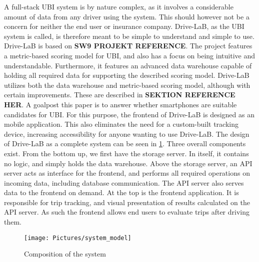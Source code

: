A full-stack UBI system is by nature complex, as it involves a considerable amount of data from any driver using the system. This should however not be a concern for neither the end user or insurance company. Drive-LaB, as the UBI system is called, is therefore meant to be simple to understand and simple to use.
Drive-LaB is based on \textbf{SW9 PROJEKT REFERENCE}. The project features a metric-based scoring model for UBI, and also has a focus on being intuitive and understandable. Furthermore, it features an advanced data warehouse capable of holding all required data for supporting the described scoring model. Drive-LaB utilizes both the data warehouse and metric-based scoring model, although with certain improvements. These are described in \textbf{SEKTION REFERENCE HER}.
A goalpost this paper is to answer whether smartphones are suitable candidates for UBI. For this purpose, the frontend of Drive-LaB is designed as an mobile application. This also eliminates the need for a custom-built tracking device, increasing accessibility for anyone wanting to use Drive-LaB.
The design of Drive-LaB as a complete system can be seen in \ref{fig:system_model}. Three overall components exist. From the bottom up, we first have the storage server. In itself, it contains no logic, and simply holds the data warehouse. Above the storage server, an API server acts as interface for the frontend, and performs all required operations on incoming data, including database communication. The API server also serves data to the frontend on demand. At the top is the frontend application. It is responsible for trip tracking, and visual presentation of results calculated on the API server. As such the frontend allows end users to evaluate trips after driving them.

\begin{figure}[tb]
\centering
\texttt{[image: Pictures/system\_model]}
\caption{Composition of the system}
\label{fig:system_model}
\end{figure}